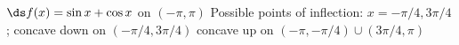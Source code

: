 {$\ds f(x) = \sin x + \cos x$ on $(-\pi,\pi)$
}
{Possible points of inflection: $x=-\pi/4,3\pi/4$;
concave down on $(-\pi/4,3\pi/4)$
concave up on $(-\pi,-\pi/4) \cup (3\pi/4,\pi)$
}
